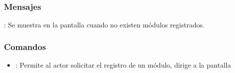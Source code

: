 \subsubsection{Mensajes}

\begin{Citemize}
	\item {}: Se muestra en la pantalla  cuando no existen módulos registrados.
\end{Citemize}


\label{IUaA}
\subsubsection{Comandos}
\begin{itemize}
	\item {}: Permite al actor solicitar el registro de un módulo, dirige a la pantalla 
\end{itemize}